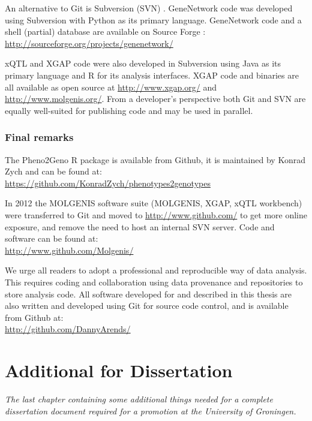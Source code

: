 An alternative to Git is Subversion (SVN) \cite{SVN:2002}. GeneNetwork code was developed 
using Subversion with Python as its primary language. GeneNetwork code and a shell (partial) 
database are available on Source Forge \cite{GeneNetwork:1994, GeneNetwork:2004}:\\
\url{http://sourceforge.org/projects/genenetwork/}

xQTL and XGAP code were also developed in Subversion \cite{SVN:2002} using Java as its primary language and 
R for its analysis interfaces. XGAP code and binaries are all available as open source at
\url{http://www.xgap.org/} and \url{http://www.molgenis.org/}. From a developer's perspective both Git and
SVN are equally well-suited for publishing code and may be used in parallel.

\subsection{Final remarks}
The Pheno2Geno R package is available from Github, it is maintained by Konrad Zych and can be found at:\\
\url{https://github.com/KonradZych/phenotypes2genotypes}

In 2012 the MOLGENIS software suite (MOLGENIS, XGAP, xQTL workbench) were transferred to Git and 
moved to \url{http://www.github.com/} to get more online exposure, and remove the need to host 
an internal SVN server. Code and software can be found at:\\
\url{http://www.github.com/Molgenis/}

We urge all readers to adopt a professional and reproducible way of data analysis. This requires 
coding and collaboration using data provenance and repositories to store analysis code. All 
software developed for and described in this thesis are also written and developed using Git 
for source code control, and is available from Github at:\\
\url{http://github.com/DannyArends/}

\chapter{Additional for Dissertation}
\thispagestyle{empty}
\emph{The last chapter containing some additional things needed for a complete 
dissertation document required for a promotion at the University of Groningen.}
\null
\vfill
\newpage

